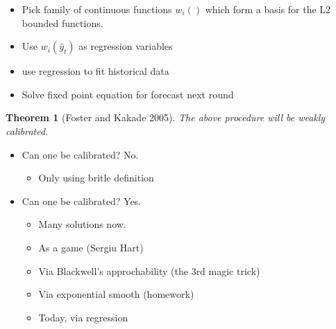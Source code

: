 \documentclass[landscape]{slides}
\newtheorem{theorem}{Theorem}
\begin{document}

\begin{itemize}
\item Pick family of continuous functions $w_i()$ which form a basis
for the L2 bounded functions. 
\item Use $w_i(\hat{y}_t)$ as regression variables
\item use regression to fit historical data
\item Solve fixed point equation for forecast next round
\end{itemize}
\begin{theorem}[Foster and Kakade 2005]
The above procedure will be weakly calibrated.
\end{theorem}



\begin{itemize}

\item Can one be calibrated? No.
\begin{itemize}
\item Only using britle definition
\end{itemize}
\item Can one be calibrated? Yes.
\begin{itemize}
\item Many solutions now.
\item As a game (Sergiu Hart)
\item Via Blackwell's approchability (the 3rd magic trick)
\item Via exponential smooth (homework)
\item Today, via regression
\end{itemize}
\end{itemize}

\end{document}
